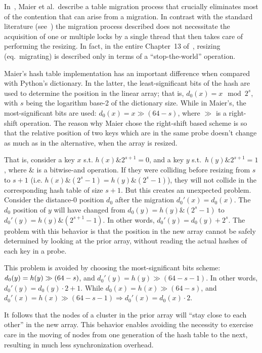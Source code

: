 In~\cite{maier}, Maier et al.\ describe a table migration process that crucially eliminates most of the contention that can arise from a migration.
In contrast with the standard literature (see~\cite[Figure~13.30]{art-mp}) the migration process described does not necessitate the acquisition of one or multiple locks by a single thread that then takes care of performing the resizing.
In fact, in the entire Chapter~13 of~\cite{art-mp}, resizing (eq.\ migrating) is described only in terms of a ``stop-the-world'' operation.

Maier's hash table implementation has an important difference when compared with Python's dictionary.
In the latter, the least-significant bits of the hash are used to determine the position in the linear array; that is, $d_0(x) = x \mod 2^s$, with $s$ being the logarithm base-2 of the dictionary size.
While in Maier's, the most-significant bits are used: $d_0(x) = x \gg (64 - s)$, where $\gg$ is a right-shift operation.
The reason why Maier chose the right-shift based scheme is so that the relative position of two keys which are in the same probe doesn't change as much as in the alternative, when the array is resized.

That is, consider a key $x$ s.t. $h(x) \mathbin{\&} 2^{s + 1} = 0$, and a key $y$ s.t.\ $h(y) \mathbin{\&} 2^{s + 1} = 1$, where $\mathbin{\&}$ is a bitwise-and operation.
If they were colliding before resizing from $s$ to $s + 1$ (i.e. $h(x) \mathbin{\&} (2^s - 1) = h(y) \mathbin{\&} (2^s - 1)$), they will not collide in the corresponding hash table of size $s + 1$.
But this creates an unexpected problem.
Consider the distance-0 position $d_0$ after the migration $d_0'(x) = d_0(x)$.
The $d_0$ position of $y$ will have changed from $d_0(y) = h(y) \mathbin{\&} (2^s - 1)$ to $d_0'(y) = h(y) \mathbin{\&} (2^{s+1} - 1)$.
In other words, $d_0'(y) = d_0(y) + 2^s$.
The problem with this behavior is that the position in the new array cannot be safely determined by looking at the prior array, without reading the actual hashes of each key in a probe.

This problem is avoided by choosing the most-significant bits scheme: $d_0(y) \\= h(y) \gg (64 - s)$, and $d_0'(y) = h(y) \gg (64 - s - 1)$.
In other words, $d_0'(y) = d_0(y) \cdot 2 + 1$.
While $d_0(x) = h(x) \gg (64 - s)$, and $d_0'(x) = h(x) \gg (64 - s - 1) \Rightarrow d_0'(x) = d_0(x) \cdot 2$.

It follows that the nodes of a cluster in the prior array will ``stay close to each other'' in the new array.
This behavior enables avoiding the necessity to exercise care in the moving of nodes from one generation of the hash table to the next, resulting in much less synchronization overhead.


